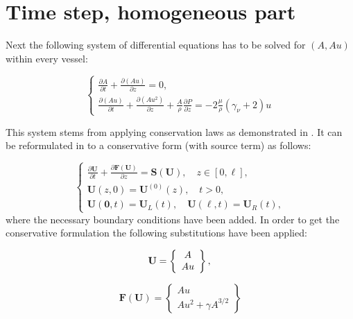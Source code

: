 \documentclass[a4paper, oneside]{discothesis}
\begin{document}
\section{Time step, homogeneous part}
Next the following system of differential equations has to be solved for $(A,Au)$ within every vessel:

\begin{equation}
	\left\{\begin{array}{l}\frac{\partial A}{\partial t} + \frac{\partial(Au)}{\partial z} = 0,\\
	\frac{\partial (Au)}{\partial t} + \frac{\partial (Au^2)}{\partial z} + \frac{A}{\rho} \frac{\partial P}{\partial z} = -2 \frac{\mu}{\rho}(\gamma_\nu + 2)u \end{array} \right.
\end{equation}

This system stems from applying conservation laws as demonstrated in \cite{book}.
It can be reformulated in to a conservative form (with source term) as follows:

\begin{equation}
	\left\{\begin{array}{l}
			\frac{\partial \mathbf{U}}{\partial t}+\frac{\partial \mathbf{F}(\mathbf{U})}{\partial z}=\mathbf{S}(\mathbf{U}), \quad z \in[0, \ell], \\
			\mathbf{U}(z, 0)=\mathbf{U}^{(0)}(z), \quad t>0, \\
			\mathbf{U}(\mathbf{0}, t)=\mathbf{U}_L(t), \quad \mathbf{U}(\ell, t)=\mathbf{U}_R(t),
	\end{array}\right.
\end{equation}
where the necessary boundary conditions have been added.
In order to get the conservative formulation the following substitutions have been applied:

\begin{equation}
	\mathbf{U}=\left\{\begin{array}{c}
			A \\
			A u
	\end{array}\right\}, \\
\end{equation}

\begin{equation}
	\mathbf{F}(\mathbf{U})=\left\{\begin{array}{c}
			A u \\
			A u^2+\gamma A^{3 / 2}
	\end{array}\right\}
\end{equation}
\end{document}
